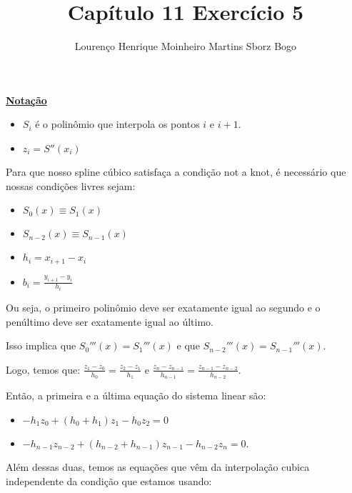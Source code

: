 \documentclass[12pt]{article}
\title{Capítulo 11 Exercício 5}
\author{Lourenço Henrique Moinheiro Martins Sborz Bogo}
\date{}
\newcommand{\mytitle}[1]{\textbf{\underline{#1}}}
\begin{document}
\maketitle

\mytitle{Notação}

\begin{itemize}
  
\item $S_i$ é o polinômio que interpola os pontos $i$ e $i+1$.
  
\item $z_i = S''(x_i)$
  
\end{itemize}



Para que nosso spline cúbico satisfaça a condição not a knot, é necessário que nossas condições livres sejam:

\begin{itemize}
  
\item $S_0(x) \equiv S_1(x)$
  
\item $S_{n-2}(x) \equiv S_{n-1}(x)$
  
\item $h_i = x_{i+1}-x_i$
  
\item $b_i = \frac{y_{i+1}-y_i}{h_i}$
  
\end{itemize}

Ou seja, o primeiro polinômio deve ser exatamente igual ao segundo e o penúltimo deve ser exatamente igual ao último.

Isso implica que $S_0'''(x) = S_1'''(x)$ e que $S_{n-2}'''(x) = S_{n-1}'''(x)$.

Logo, temos que:
$\frac{z_1-z_0}{h_0} = \frac{z_2-z_1}{h_1}$ e $\frac{z_n-z_{n-1}}{h_{n-1}} = \frac{z_{n-1}-z_{n-2}}{h_{n-2}}$.

Então, a primeira e a última equação do sistema linear são:

\begin{itemize}
  
\item $-h_1z_0 + (h_0+h_1)z_1 - h_0z_2 = 0$
  
\item $-h_{n-1}z_{n-2} + (h_{n-2}+h_{n-1})z_{n-1} - h_{n-2}z_n = 0$.
  
\end{itemize}

Além dessas duas, temos as equações que vêm da interpolação cubica independente da condição que estamos usando:
\end{document}
